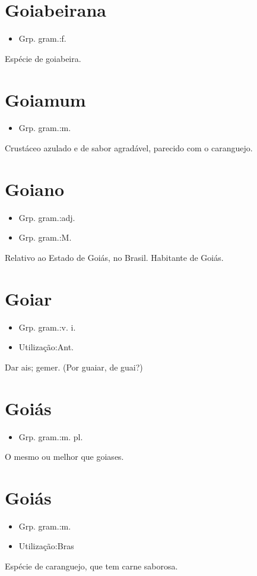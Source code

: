 \section{Goiabeirana}
\begin{itemize}
\item {Grp. gram.:f.}
\end{itemize}
Espécie de goiabeira.
\section{Goiamum}
\begin{itemize}
\item {Grp. gram.:m.}
\end{itemize}
Crustáceo azulado e de sabor agradável, parecido com o caranguejo.
\section{Goiano}
\begin{itemize}
\item {Grp. gram.:adj.}
\end{itemize}
\begin{itemize}
\item {Grp. gram.:M.}
\end{itemize}
Relativo ao Estado de Goiás, no Brasil.
Habitante de Goiás.
\section{Goiar}
\begin{itemize}
\item {Grp. gram.:v. i.}
\end{itemize}
\begin{itemize}
\item {Utilização:Ant.}
\end{itemize}
Dar ais; gemer.
(Por \textunderscore guaiar\textunderscore , de \textunderscore guai?\textunderscore )
\section{Goiás}
\begin{itemize}
\item {Grp. gram.:m. pl.}
\end{itemize}
O mesmo ou melhor que \textunderscore goiases\textunderscore .
\section{Goiás}
\begin{itemize}
\item {Grp. gram.:m.}
\end{itemize}
\begin{itemize}
\item {Utilização:Bras}
\end{itemize}
Espécie de caranguejo, que tem carne saborosa.
